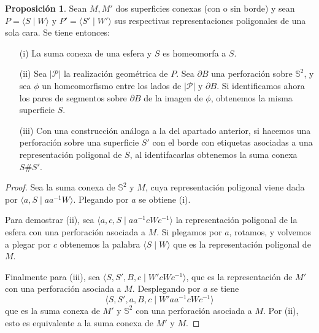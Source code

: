 \documentclass[10pt]{report}
\newcommand{\Esfera}{\mathbb{S}^2}
\theoremstyle{definition}
\newtheorem{prop}[defin]{Proposición}
\begin{document}
\begin{prop}\label{prop:suma_esfera}
Sean $M,M'$ dos superficies conexas (con o sin borde) y sean $P=\langle S\mid W\rangle$ y $P'=\langle S'\mid W'\rangle$ sus respectivas representaciones poligonales de una sola cara. Se tiene entonces:
\begin{itemize}
\item[(i)] La suma conexa de una esfera y $S$ es homeomorfa a $S$.
\item[(ii)] Sea $|\mathcal{P}|$ la realización geométrica de $P$. Sea $\partial B$ una perforación sobre $\Esfera$, y sea $\phi$ un homeomorfismo entre los lados de $|\mathcal{P}|$ y $\partial B$. Si identificamos ahora los pares de segmentos sobre $\partial B$ de la imagen de $\phi$, obtenemos la misma superficie $S$. 
\item[(iii)] Con una construcción análoga a la del apartado anterior, si hacemos una perforación sobre una superficie $S'$ con el borde con etiquetas asociadas a una representación poligonal de $S$, al identifacarlas obtenemos la suma conexa $S\# S'$. 
\end{itemize}
\end{prop}
\begin{proof}
Sea la suma conexa de $\Esfera$ y $M$, cuya representación poligonal viene dada por $\langle a,S\mid aa^{-1}W\rangle$. Plegando por $a$ se obtiene (i).

Para demostrar (ii), sea $\langle a,c,S\mid aa^{-1}cWc^{-1}\rangle$ la representación poligonal de la esfera con una perforación asociada a $M$. Si plegamos por $a$, rotamos, y volvemos a plegar por $c$ obtenemos la palabra $\langle S\mid W\rangle$ que es la representación poligonal de $M$.

Finalmente para (iii), sea $\langle S,S',B,c\mid W'cWc^{-1}\rangle$, que es la representación de $M'$ con una perforación asociada a $M$. Desplegando por $a$ se tiene $$\langle S,S',a,B,c\mid W'aa^{-1}cWc^{-1}\rangle$$ que es la suma conexa de $M'$ y $\Esfera$ con una perforación asociada a $M$. Por (ii), esto es equivalente a la suma conexa de $M'$ y $M$. 
\end{proof}
\end{document}
